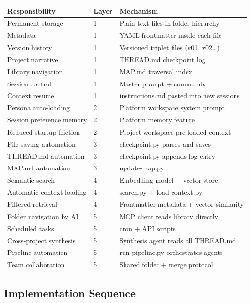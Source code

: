 \documentclass[12pt,letterpaper]{article}
\begin{document}
\begin{center}
\begin{tabular}{@{}p{3.5cm}p{2cm}p{7cm}@{}}
\toprule
\textbf{Responsibility} & \textbf{Layer} & \textbf{Mechanism} \\
\midrule
Permanent storage & 1 & Plain text files in folder hierarchy \\
Metadata & 1 & YAML frontmatter inside each file \\
Version history & 1 & Versioned triplet files (v01, v02\ldots) \\
Project narrative & 1 & THREAD.md checkpoint log \\
Library navigation & 1 & MAP.md traversal index \\
Session control & 1 & Master prompt + commands \\
Context resume & 1 & instructions.md pasted into new sessions \\
\midrule
Persona auto-loading & 2 & Platform workspace system prompt \\
Session preference memory & 2 & Platform memory feature \\
Reduced startup friction & 2 & Project workspace pre-loaded context \\
\midrule
File saving automation & 3 & checkpoint.py parses and saves \\
THREAD.md automation & 3 & checkpoint.py appends log entry \\
MAP.md automation & 3 & update-map.py \\
\midrule
Semantic search & 4 & Embedding model + vector store \\
Automatic context loading & 4 & search.py + load-context.py \\
Filtered retrieval & 4 & Frontmatter metadata + vector similarity \\
\midrule
Folder navigation by AI & 5 & MCP client reads library directly \\
Scheduled tasks & 5 & cron + API scripts \\
Cross-project synthesis & 5 & Synthesis agent reads all THREAD.md \\
Pipeline automation & 5 & run-pipeline.py orchestrates agents \\
Team collaboration & 5 & Shared folder + merge protocol \\
\bottomrule
\end{tabular}
\end{center}

\subsection{Implementation Sequence}
\end{document}
